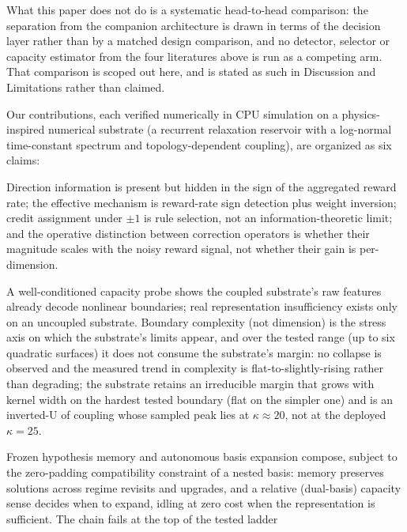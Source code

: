\documentclass[preprint,12pt]{elsarticle}
\begin{document}
What this paper does not do is a systematic head-to-head comparison: the
separation from the companion architecture \cite{companionB} is drawn in terms
of the decision layer rather than by a matched design comparison, and no
detector, selector or capacity estimator from the four literatures above is
run as a competing arm. That comparison is scoped out here, and is stated as
such in Discussion and Limitations rather than claimed.

Our contributions, each verified numerically in CPU simulation on a
physics-inspired numerical substrate (a recurrent relaxation reservoir with
a log-normal time-constant spectrum and topology-dependent coupling), are
organized as six claims:

\begin{description}[leftmargin=1.6em,style=nextline]
\item[R1 (direction, rule selection, structure).] Direction information is
present but hidden in the sign of the aggregated reward rate; the effective
mechanism is reward-rate sign detection plus weight inversion; credit
assignment under $\pm1$ is rule selection, not an information-theoretic
limit; and the operative distinction between correction operators is
whether their magnitude scales with the noisy reward signal, not whether
their gain is per-dimension.
\item[R2 (representation sufficiency).] A well-conditioned capacity probe
shows the coupled substrate's raw features already decode nonlinear
boundaries; real representation insufficiency exists only on an uncoupled
substrate. Boundary complexity (not dimension) is the stress axis on which the
substrate's limits appear, and over the tested range (up to six quadratic
surfaces) it does not consume the substrate's margin: no collapse is observed
and the measured trend in complexity is flat-to-slightly-rising rather than
degrading; the substrate
retains an irreducible margin that grows with kernel width on the hardest
tested boundary (flat on the simpler one) and is an inverted-U of coupling
whose sampled peak lies at $\kappa\approx20$, not at the deployed
$\kappa=25$.
\item[R3 (the self-evolution loop).] Frozen hypothesis memory and
autonomous basis expansion compose, subject to the zero-padding compatibility
constraint of a nested basis: memory preserves
solutions across regime revisits and upgrades, and a relative (dual-basis)
capacity sense decides when to expand, idling at zero cost when the
representation is sufficient. The chain fails at the top of the tested ladder

\end{description}
\end{document}

